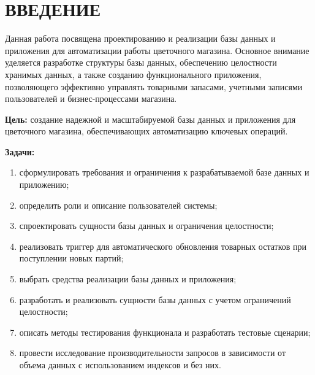 \chapter*{ВВЕДЕНИЕ}

Данная работа посвящена проектированию и реализации базы данных и приложения для автоматизации работы цветочного магазина. Основное внимание уделяется разработке структуры базы данных, обеспечению целостности хранимых данных, а также созданию функционального приложения, позволяющего эффективно управлять товарными запасами, учетными записями пользователей и бизнес-процессами магазина.

\textbf{Цель:} создание надежной и масштабируемой базы данных и приложения для цветочного магазина, обеспечивающих автоматизацию ключевых операций.

\textbf{Задачи:}
\begin{enumerate}[label={\arabic*)}]
	\item сформулировать требования и ограничения к разрабатываемой базе данных и приложению;
	\item определить роли и описание пользователей системы;
	\item спроектировать сущности базы данных и ограничения целостности;
	\item реализовать триггер для автоматического обновления товарных остатков при поступлении новых партий;
	\item выбрать средства реализации базы данных и приложения;
	\item разработать и реализовать сущности базы данных с учетом ограничений целостности;
	\item описать методы тестирования функционала и разработать тестовые сценарии;
	\item провести исследование производительности запросов в зависимости от объема данных с использованием индексов и без них.
\end{enumerate}
